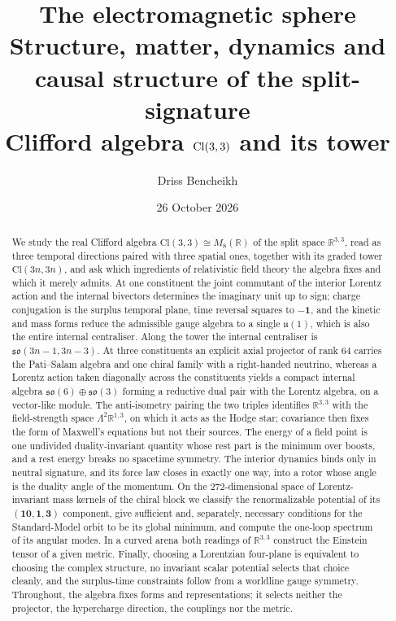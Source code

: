 \documentclass[11pt]{article}
\title{\textbf{The electromagnetic sphere}\\[6pt]
\large Structure, matter, dynamics and causal structure of the split-signature\\
Clifford algebra $\Cl(3,3)$ and its tower}
\author{Driss Bencheikh}
\date{26 October 2026}
\theoremstyle{plain}
\theoremstyle{definition}
\newcommand{\R}{\mathbb{R}}
\newcommand{\Cl}{\mathrm{Cl}}
\newcommand{\so}[1]{\mathfrak{so}(#1)}
\newcommand{\uu}[1]{\mathfrak{u}(#1)}
\newcommand{\id}{\mathbf 1}
\begin{document}
\maketitle

\begin{abstract}
\noindent
We study the real Clifford algebra $\Cl(3,3)\cong M_8(\R)$ of the split space $\R^{3,3}$, read as three temporal
directions paired with three spatial ones, together with its graded tower $\Cl(3n,3n)$, and ask which ingredients of
relativistic field theory the algebra fixes and which it merely admits. At one constituent the joint commutant of the
interior Lorentz action and the internal bivectors determines the imaginary unit up to sign; charge conjugation is the
surplus temporal plane, time reversal squares to $-\id$, and the kinetic and mass forms reduce the admissible gauge algebra
to a single $\uu1$, which is also the entire internal centraliser. Along the tower the internal centraliser is
$\so{3n-1,3n-3}$. At three constituents an explicit axial projector of rank $64$ carries the Pati--Salam algebra and one
chiral family with a right-handed neutrino, whereas a Lorentz action taken diagonally across the constituents yields a
compact internal algebra $\so6\oplus\so3$ forming a reductive dual pair with the Lorentz algebra, on a vector-like
module. The anti-isometry pairing the two triples identifies $\R^{3,3}$ with the field-strength space
$\Lambda^2\R^{1,3}$, on which it acts as the Hodge star; covariance then fixes the form of Maxwell's equations but not
their sources. The energy of a field point is one undivided duality-invariant quantity whose rest part is the minimum over boosts, and
a rest energy breaks no spacetime symmetry. The interior dynamics binds only in neutral signature, and its force law closes in exactly one way, into a
rotor whose angle is the duality angle of the momentum. On the $272$-dimensional space of Lorentz-invariant mass kernels of
the chiral block we classify the renormalizable potential of its $(\mathbf{10},\mathbf1,\mathbf3)$ component, give sufficient and,
separately, necessary conditions for the Standard-Model orbit to be its global minimum, and compute the one-loop spectrum of its angular modes. In a curved
arena both readings of $\R^{3,3}$ construct the Einstein tensor of a given metric. Finally, choosing a Lorentzian
four-plane is equivalent to choosing the complex structure, no invariant scalar potential selects that choice cleanly, and
the surplus-time constraints follow from a worldline gauge symmetry. Throughout, the algebra fixes forms and
representations; it selects neither the projector, the hypercharge direction, the couplings nor the metric.
\end{abstract}
\end{document}
